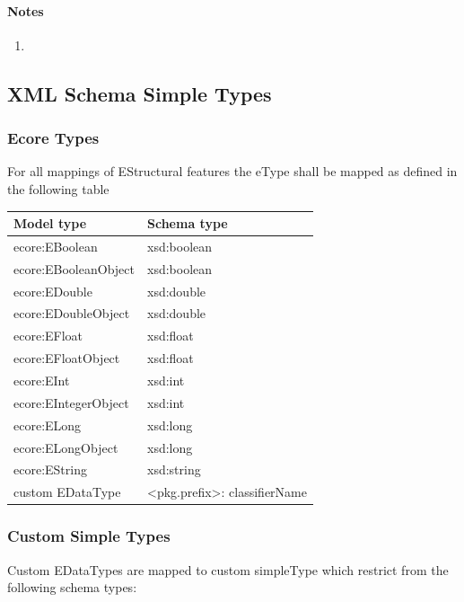 \documentclass[11pt,a4paper]{article}
\begin{document}
\paragraph{Notes}
\begin{enumerate}
\item
\end{enumerate}


\subsection{XML Schema Simple Types}

\subsubsection{Ecore Types}
For all mappings of EStructural features the eType shall be mapped as defined in the following table
\begin{center}
\begin{tabular}{|l|l|}
\hline
Model type & Schema type \\
\hline
ecore:EBoolean & xsd:boolean \\
ecore:EBooleanObject & xsd:boolean \\
ecore:EDouble       & xsd:double \\
ecore:EDoubleObject     & xsd:double \\
ecore:EFloat              & xsd:float \\
ecore:EFloatObject      & xsd:float \\
ecore:EInt                 & xsd:int \\
ecore:EIntegerObject     & xsd:int \\
ecore:ELong               & xsd:long \\
ecore:ELongObject     & xsd:long \\
ecore:EString              & xsd:string \\
custom EDataType		& \textless pkg.prefix\textgreater : classifierName \\
\hline
\end{tabular}
\end{center}


\subsubsection{Custom Simple Types}
Custom EDataTypes are mapped to custom simpleType which restrict from the following schema types:
\end{document}
